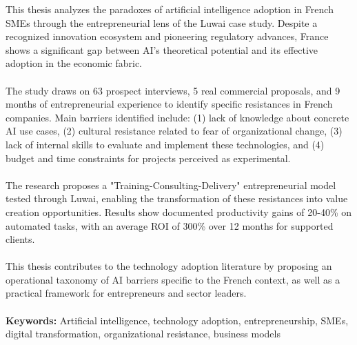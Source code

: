 This thesis analyzes the paradoxes of artificial intelligence adoption in French SMEs through the entrepreneurial lens of the Luwai case study. Despite a recognized innovation ecosystem and pioneering regulatory advances, France shows a significant gap between AI's theoretical potential and its effective adoption in the economic fabric.
\\\\
The study draws on 63 prospect interviews, 5 real commercial proposals, and 9 months of entrepreneurial experience to identify specific resistances in French companies. Main barriers identified include: (1) lack of knowledge about concrete AI use cases, (2) cultural resistance related to fear of organizational change, (3) lack of internal skills to evaluate and implement these technologies, and (4) budget and time constraints for projects perceived as experimental.
\\\\
The research proposes a "Training-Consulting-Delivery" entrepreneurial model tested through Luwai, enabling the transformation of these resistances into value creation opportunities. Results show documented productivity gains of 20-40\% on automated tasks, with an average ROI of 300\% over 12 months for supported clients.
\\\\
This thesis contributes to the technology adoption literature by proposing an operational taxonomy of AI barriers specific to the French context, as well as a practical framework for entrepreneurs and sector leaders.
\\\\
\textbf{Keywords:} Artificial intelligence, technology adoption, entrepreneurship, SMEs, digital transformation, organizational resistance, business models
